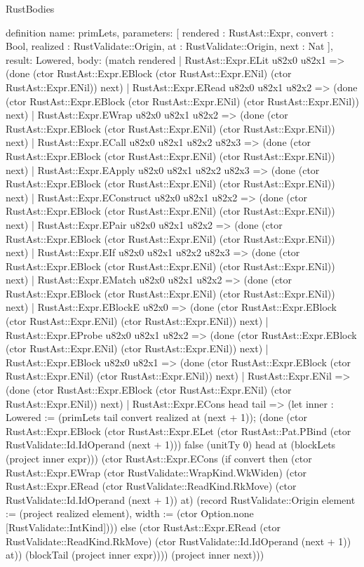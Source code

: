 \begin{lexlean}{RustBodies}
\begin{semanticmodule}
definition{
  name: primLets,
  parameters: [
    rendered : RustAst::Expr,
    convert : Bool,
    realized : RustValidate::Origin,
    at : RustValidate::Origin,
    next : Nat
  ],
  result: Lowered,
  body: (match rendered
    | RustAst::Expr.ELit u82x0 u82x1 => (done (ctor RustAst::Expr.EBlock (ctor RustAst::Expr.ENil) (ctor RustAst::Expr.ENil)) next)
    | RustAst::Expr.ERead u82x0 u82x1 u82x2 => (done (ctor RustAst::Expr.EBlock (ctor RustAst::Expr.ENil) (ctor RustAst::Expr.ENil)) next)
    | RustAst::Expr.EWrap u82x0 u82x1 u82x2 => (done (ctor RustAst::Expr.EBlock (ctor RustAst::Expr.ENil) (ctor RustAst::Expr.ENil)) next)
    | RustAst::Expr.ECall u82x0 u82x1 u82x2 u82x3 => (done (ctor RustAst::Expr.EBlock (ctor RustAst::Expr.ENil) (ctor RustAst::Expr.ENil)) next)
    | RustAst::Expr.EApply u82x0 u82x1 u82x2 u82x3 => (done (ctor RustAst::Expr.EBlock (ctor RustAst::Expr.ENil) (ctor RustAst::Expr.ENil)) next)
    | RustAst::Expr.EConstruct u82x0 u82x1 u82x2 => (done (ctor RustAst::Expr.EBlock (ctor RustAst::Expr.ENil) (ctor RustAst::Expr.ENil)) next)
    | RustAst::Expr.EPair u82x0 u82x1 u82x2 => (done (ctor RustAst::Expr.EBlock (ctor RustAst::Expr.ENil) (ctor RustAst::Expr.ENil)) next)
    | RustAst::Expr.EIf u82x0 u82x1 u82x2 u82x3 => (done (ctor RustAst::Expr.EBlock (ctor RustAst::Expr.ENil) (ctor RustAst::Expr.ENil)) next)
    | RustAst::Expr.EMatch u82x0 u82x1 u82x2 => (done (ctor RustAst::Expr.EBlock (ctor RustAst::Expr.ENil) (ctor RustAst::Expr.ENil)) next)
    | RustAst::Expr.EBlockE u82x0 => (done (ctor RustAst::Expr.EBlock (ctor RustAst::Expr.ENil) (ctor RustAst::Expr.ENil)) next)
    | RustAst::Expr.EProbe u82x0 u82x1 u82x2 => (done (ctor RustAst::Expr.EBlock (ctor RustAst::Expr.ENil) (ctor RustAst::Expr.ENil)) next)
    | RustAst::Expr.EBlock u82x0 u82x1 => (done (ctor RustAst::Expr.EBlock (ctor RustAst::Expr.ENil) (ctor RustAst::Expr.ENil)) next)
    | RustAst::Expr.ENil => (done (ctor RustAst::Expr.EBlock (ctor RustAst::Expr.ENil) (ctor RustAst::Expr.ENil)) next)
    | RustAst::Expr.ECons head tail => (let inner : Lowered := (primLets tail convert realized at (next + 1)); (done (ctor RustAst::Expr.EBlock (ctor RustAst::Expr.ELet (ctor RustAst::Pat.PBind (ctor RustValidate::Id.IdOperand (next + 1))) false (unitTy 0) head at (blockLets (project inner expr))) (ctor RustAst::Expr.ECons (if convert then (ctor RustAst::Expr.EWrap (ctor RustValidate::WrapKind.WkWiden) (ctor RustAst::Expr.ERead (ctor RustValidate::ReadKind.RkMove) (ctor RustValidate::Id.IdOperand (next + 1)) at) (record RustValidate::Origin {element := (project realized element), width := (ctor Option.none [RustValidate::IntKind])})) else (ctor RustAst::Expr.ERead (ctor RustValidate::ReadKind.RkMove) (ctor RustValidate::Id.IdOperand (next + 1)) at)) (blockTail (project inner expr)))) (project inner next)))
}
\end{semanticmodule}
\end{lexlean}
